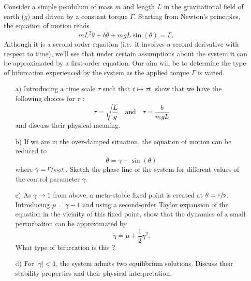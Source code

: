 \begin{problem}
  Consider a simple pendulum of mass $m$ and length $L$ in the gravitational field of earth ($g$) and driven by a constant torque $\Gamma$.
  Starting from Newton's principles, the equation of motion reads
  \[
  m L^2 \ddot{\theta} + b \dot{\theta} + mgL \sin(\theta) = \Gamma.
  \]
  Although it is a second-order equation (i.e.\ it involves a second derivative with respect to time), we'll see that under certain assumptions about the system it can be approximated by a first-order equation.
  Our aim will be to determine the type of bifurcation experienced by the system as the applied torque $\Gamma$ is varied.

  \bigskip

  \begin{enumerate}
  \item[a)] Introducing a time scale $\tau$ such that $t \mapsto \tau t$, show that we have the following choices for $\tau$ :
    \[
    \tau = \sqrt{\dfrac{L}{g}} \quad \text{and} \quad \tau = \dfrac{b}{mgL}
    \]
    and discuss their physical meaning.

  \item[b)] If we are in the over-damped situation, the equation of motion can be reduced to
    \[
    \dot{\theta}  = \gamma - \sin(\theta)
    \]
    where $\gamma = \nicefrac{\Gamma}{mgL}$.
    Sketch the phase line of the system for different values of the control parameter $\gamma$.

  \item[c)] As $\gamma \to 1$ from above, a meta-stable fixed point is created at $\theta = \nicefrac{\pi}{2}$.
    Introducing $\mu = \gamma - 1$ and using a second-order Taylor expansion of the equation in the vicinity of this fixed point, show that the dynamics of a small perturbation can be approximated by
    \[
    \dot{\eta} = \mu + \dfrac{1}{2}\eta^2.
    \]
    What type of bifurcation is this ?

  \item[d)] For $\vert \gamma \vert < 1$, the system admits two equilibrium solutions.
    Discuss their stability properties and their physical interpretation.
  \end{enumerate}
\end{problem}

\bigskip

